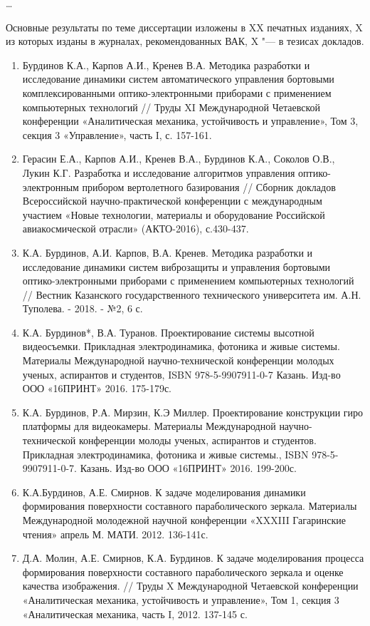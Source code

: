 {\contribution}  \ldots

{\publications} Основные результаты по теме диссертации изложены в XX печатных изданиях,
    X из которых изданы в журналах, рекомендованных ВАК,
    X "--- в тезисах докладов.
    
\begin{enumerate}
  \item Бурдинов К.А., Карпов А.И., Кренев В.А.   Методика разработки и исследование динамики систем автоматического управления бортовыми комплексированными оптико-электронными приборами с применением компьютерных технологий // Труды XI Международной Четаевской конференции «Аналитическая механика, устойчивость и управление», Том 3, секция 3 «Управление», часть I, с. 157-161.
  \item Герасин Е.А., Карпов А.И., Кренев В.А., Бурдинов К.А., Соколов О.В., Лукин К.Г. Разработка и исследование алгоритмов управления оптико-электронным прибором вертолетного базирования // Сборник докладов Всероссийской научно-практической конференции с международным участием «Новые технологии, материалы и оборудование Российской авиакосмической отрасли» (АКТО-2016), с.430-437.
  \item К.А. Бурдинов, А.И. Карпов, В.А. Кренев. Методика разработки и исследование динамики систем виброзащиты и управления бортовыми оптико-электронными приборами с применением компьютерных технологий // Вестник Казанского государственного технического университета им. А.Н. Туполева. - 2018. - №2, 6 с.
  \item К.А. Бурдинов*, В.А. Туранов. Проектирование системы высотной видеосъемки. Прикладная электродинамика, фотоника и живые системы. Материалы Международной научно-технической конференции молодых ученых, аспирантов и студентов, ISBN 978-5-9907911-0-7
Казань. Изд-во ООО «16ПРИНТ» 2016. 175-179с.
  \item К.А. Бурдинов, Р.А. Мирзин, К.Э Миллер. Проектирование конструкции гиро платформы для видеокамеры. Материалы Международной научно-технической конференции молоды ученых, аспирантов и студентов. Прикладная электродинамика, фотоника и живые системы., ISBN 978-5-9907911-0-7. Казань. Изд-во ООО «16ПРИНТ» 2016. 199-200с.
  \item К.А.Бурдинов, А.Е. Смирнов. К задаче моделирования динамики формирования поверхности составного параболического зеркала. Материалы Международной молодежной научной конференции «XXXIII Гагаринские чтения» апрель М. МАТИ. 2012. 136-141с.
  \item Д.А. Молин, А.Е. Смирнов, К.А. Бурдинов. К задаче моделирования процесса формирования поверхности составного параболического зеркала и оценке качества изображения. // Труды X Международной Четаевской конференции «Аналитическая механика, устойчивость и управление», Том 1, секция 3 «Аналитическая механика, часть I, 2012. 137-145 с.

\end{enumerate}
